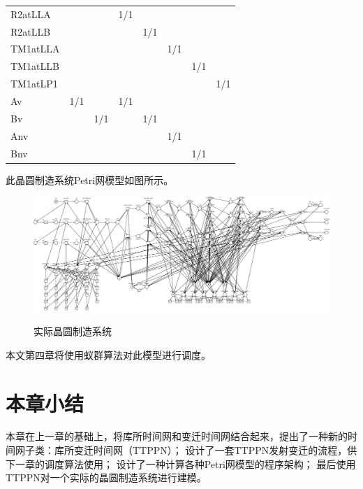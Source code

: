 \begin{table}[H]
{\begin{tabular}{l|lllllll}
			R2atLLA  &           &           & 1/1       &           &            &            &            \\
			R2atLLB  &           &           &           & 1/1       &            &            &            \\
			TM1atLLA &           &           &           &           & 1/1        &            &            \\
			TM1atLLB &           &           &           &           &            & 1/1        &            \\
			TM1atLP1 &           &           &           &           &            &            & 1/1        \\
			Av       & 1/1       &           & 1/1       &           &            &            &            \\
			Bv       &           & 1/1       &           & 1/1       &            &            &            \\
			Anv      &           &           &           &           & 1/1        &            &            \\
			Bnv      &           &           &           &           &            & 1/1        &            \\
			\bottomrule
		\end{tabular}
	}
\end{table}

此晶圆制造系统Petri网模型如图所示。

\begin{figure}[H]
	\centering
	\includegraphics[width=\linewidth]{figures/国赛问题一完全.pdf}\\
	\caption{实际晶圆制造系统}
\end{figure}

本文第四章将使用蚁群算法对此模型进行调度。
\section{本章小结}
本章在上一章的基础上，将库所时间网和变迁时间网结合起来，提出了一种新的时间网子类：库所变迁时间网（TTPPN）；
设计了一套TTPPN发射变迁的流程，供下一章的调度算法使用；
设计了一种计算各种Petri网模型的程序架构；
最后使用TTPPN对一个实际的晶圆制造系统进行建模。